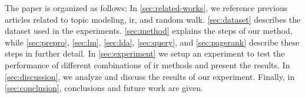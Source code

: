 The paper is organized as follows:
In \autoref{sec:related-works}, we reference previous articles related to topic modeling, \gls{ir}, and random walk.
\autoref{sec:dataset} describes the dataset used in the experiments.
\autoref{sec:method} explains the steps of our method, while \autoref{sec:prepro}, \autoref{sec:lm}, \autoref{sec:lda}, \autoref{sec:query}, and \autoref{sec:pagerank} describe these steps in further detail.
In \autoref{sec:experiment} we setup an experiment to test the performance of different combinations of \gls{ir} methods and present the results.
In \autoref{sec:discussion}, we analyze and discuss the results of our experiment.
Finally, in \autoref{sec:conclusion}, conclusions and future work are given.
